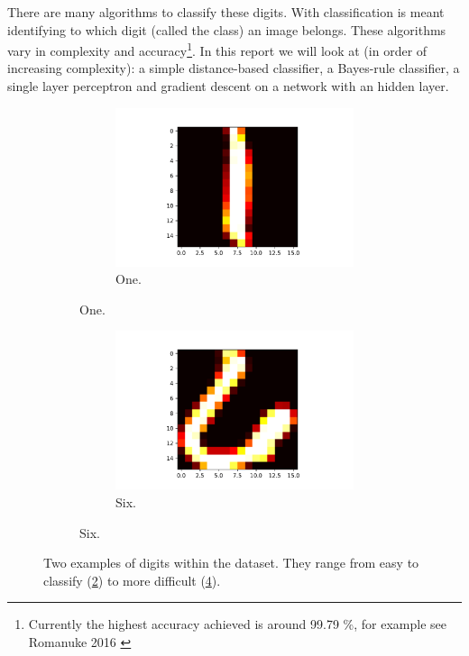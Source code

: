 \documentclass[10 pt, a4paper]{article}
\begin{document}
There are many algorithms to classify these digits. With classification  is meant identifying to which digit (called the class) an image belongs. These algorithms vary in complexity and accuracy\footnote{Currently the highest accuracy achieved is around 99.79 \%, for example see Romanuke 2016 \cite{mnist}}. In this report we will look at (in order of increasing complexity): a simple distance-based classifier, a Bayes-rule classifier, a single layer perceptron and gradient descent on a network with an hidden layer.

\begin{figure}[H] 
\begin{subfigure}[b]{0.5\textwidth}
\begin{figure}[H]
\includegraphics[width=\textwidth]{example_digit_easy}
\caption{One.}
\label{fig:digiteasy}
\end{figure}
\end{subfigure}
\begin{subfigure}[b]{0.5\textwidth}
\begin{figure}[H] 
\includegraphics[width=\textwidth]{example_digit_hard}
\caption{Six.}
\label{fig:digithard}
\end{figure}
\end{subfigure}
\caption{Two examples of digits within the dataset. They range from easy to classify (\ref{fig:digiteasy}) to more difficult (\ref{fig:digithard}).}
\label{fig:digits}
\end{figure}
\end{document}
